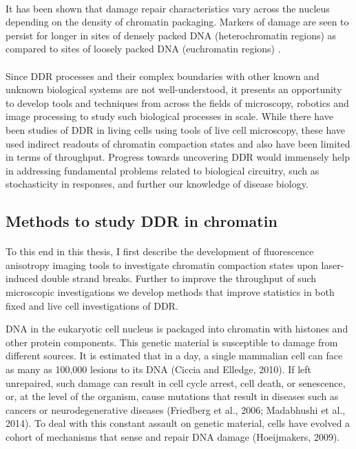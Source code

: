 \paragraph*{} It has been shown that damage repair characteristics vary across the nucleus depending on the density of chromatin packaging. Markers of damage are seen to persist for longer in sites of densely packed DNA (heterochromatin regions) as compared to sites of loosely packed DNA (euchromatin regions) \cite{goodarzi2008atm}.

\paragraph*{} Since DDR processes and their complex boundaries with other known and unknown biological systems are not well-understood, it presents an opportunity to develop tools and techniques from across the fields of microscopy, robotics and image processing to study such biological processes in scale. While there have been studies of DDR in living cells using tools of live cell microscopy, these have used indirect readouts of chromatin compaction states and also have been limited in terms of throughput. Progress towards uncovering DDR would immensely help in addressing fundamental problems related to biological circuitry, such as stochasticity in responses, and further our knowledge of disease biology.

\subsection{Methods to study DDR in chromatin}
\paragraph*{} To this end in this thesis, I first describe the development of fluorescence anisotropy imaging tools to investigate chromatin compaction states upon laser-induced double strand breaks. Further to improve the throughput of such microscopic investigations we develop methods that improve statistics in both fixed and live cell investigations of DDR.



DNA in the eukaryotic cell nucleus is packaged into chromatin with histones and other protein components. This genetic material is susceptible to damage from different sources. It is estimated that in a day, a single mammalian cell can face as many as 100,000 lesions to its DNA (Ciccia and Elledge, 2010). If left unrepaired, such damage can result in cell cycle arrest, cell death, or senescence, or, at the level of the organism, cause mutations that result in diseases such as cancers or neurodegenerative diseases (Friedberg et al., 2006; Madabhushi et al., 2014). To deal with this constant assault on genetic material, cells have evolved a cohort of mechanisms that sense and repair DNA damage (Hoeijmakers, 2009).

